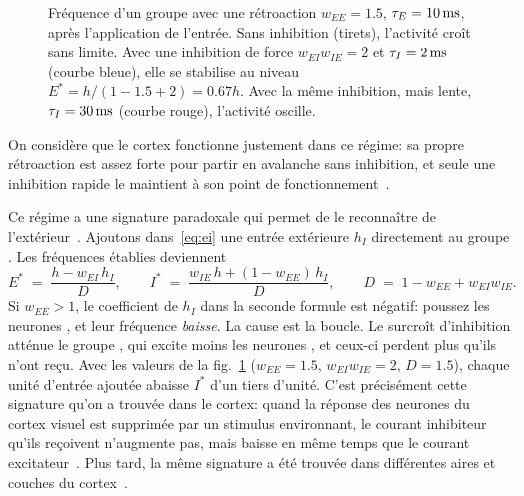 \begin{figure}[t]
\centering
{}
\caption{Fréquence d'un groupe  avec une rétroaction $w_{EE}=1.5$, $\tau_E=10\,\text{ms}$, après l'application de l'entrée. Sans inhibition (tirets), l'activité croît sans limite. Avec une inhibition de force $w_{EI}w_{IE}=2$ et $\tau_I=2\,\text{ms}$ (courbe bleue), elle se stabilise au niveau $E^*=h/(1-1.5+2)=0.67h$. Avec la même inhibition, mais lente, $\tau_I=30\,\text{ms}$ (courbe rouge), l'activité oscille.}
\label{fig:ei}
\end{figure}

On considère que le cortex fonctionne justement dans ce régime: sa propre rétroaction est assez forte pour partir en avalanche sans inhibition, et seule une inhibition rapide le maintient à son point de fonctionnement~\cite{Tsodyks1997isn}.

Ce régime a une signature paradoxale qui permet de le reconnaître de l'extérieur~\cite{Tsodyks1997isn}. Ajoutons dans~\eqref{eq:ei} une entrée extérieure $h_I$ directement au groupe . Les fréquences établies deviennent
\begin{equation}
E^* \;=\; \frac{h-w_{EI}\,h_I}{D},\qquad
I^* \;=\; \frac{w_{IE}\,h+(1-w_{EE})\,h_I}{D},\qquad
D \;=\; 1-w_{EE}+w_{EI}w_{IE} .
\label{eq:isn}
\end{equation}
Si $w_{EE}>1$, le coefficient de $h_I$ dans la seconde formule est négatif: poussez les neurones , et leur fréquence \emph{baisse}. La cause est la boucle. Le surcroît d'inhibition atténue le groupe , qui excite moins les neurones , et ceux-ci perdent plus qu'ils n'ont reçu. Avec les valeurs de la fig.~\ref{fig:ei} ($w_{EE}=1.5$, $w_{EI}w_{IE}=2$, $D=1.5$), chaque unité d'entrée ajoutée abaisse $I^*$ d'un tiers d'unité. C'est précisément cette signature qu'on a trouvée dans le cortex: quand la réponse des neurones du cortex visuel est supprimée par un stimulus environnant, le courant inhibiteur qu'ils reçoivent n'augmente pas, mais baisse en même temps que le courant excitateur~\cite{Ozeki2009}. Plus tard, la même signature a été trouvée dans différentes aires et couches du cortex~\cite{Sanzeni2020}.

